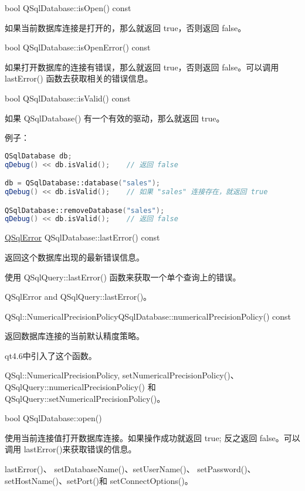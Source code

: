 bool QSqlDatabase::isOpen() const


如果当前数据库连接是打开的，那么就返回 true，否则返回 false。

bool QSqlDatabase::isOpenError() const


如果打开数据库的连接有错误，那么就返回 true，否则返回 false。可以调用 lastError() 函数去获取相关的错误信息。

bool QSqlDatabase::isValid() const


如果 QSqlDatabase() 有一个有效的驱动，那么就返回 true。

例子：

\begin{lstlisting}[language=C++]
QSqlDatabase db;
qDebug() << db.isValid();    // 返回 false

db = QSqlDatabase::database("sales");
qDebug() << db.isValid();    // 如果 "sales" 连接存在，就返回 true

QSqlDatabase::removeDatabase("sales");
qDebug() << db.isValid();    // 返回 false
\end{lstlisting}

\href{https://doc.qt.io/qt-5/qsqlerror.html}{QSqlError} QSqlDatabase::lastError() const

返回这个数据库出现的最新错误信息。

使用 QSqlQuery::lastError() 函数来获取一个单个查询上的错误。

\begin{notice}[另请参阅]
QSqlError and QSqlQuery::lastError()。
\end{notice}


QSql::NumericalPrecisionPolicyQSqlDatabase::numericalPrecisionPolicy() const

返回数据库连接的当前默认精度策略。

qt4.6中引入了这个函数。

\begin{notice}[另请参阅]
QSql::NumericalPrecisionPolicy, setNumericalPrecisionPolicy()、
QSqlQuery::numericalPrecisionPolicy() 和 QSqlQuery::setNumericalPrecisionPolicy()。
\end{notice}



bool QSqlDatabase::open()


使用当前连接值打开数据库连接。如果操作成功就返回 true; 反之返回 false。可以调用 lastError()来获取错误的信息。

\begin{notice}[另请参阅]
lastError()、 setDatabaseName()、setUserName()、
setPassword()、setHostName()、setPort()和 setConnectOptions()。
\end{notice}


